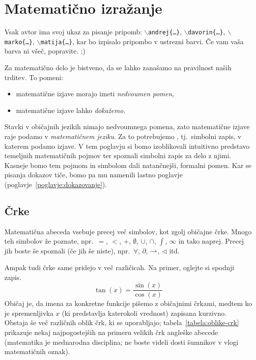 \chapter{Matematično izražanje}\label{poglavje:matematicno-izrazanje}


        \alert{Vsak avtor ima svoj ukaz za pisanje pripomb: \textcolor{andrejcolor}{\texttt{$\backslash$andrej\{\ldots\}}}, \textcolor{davorincolor}{\texttt{$\backslash$davorin\{\ldots\}}}, \textcolor{markocolor}{\texttt{$\backslash$marko\{\ldots\}}}, \textcolor{matijacolor}{\texttt{$\backslash$matija\{\ldots\}}}, kar bo izpisalo pripombo v ustrezni barvi. Če vam vaša barva ni všeč, popravite. ;)}


        Za matematično delo je bistveno, da se lahko zanašamo na pravilnost naših trditev. To pomeni:
        \begin{itemize}
                \item
                        matematične izjave morajo imeti \emph{nedvoumen pomen},
                \item
                        matematične izjave lahko \emph{dokažemo}.
        \end{itemize}

        Stavki v običajnih jezikih nimajo nedvoumnega pomena, zato matematične izjave raje podamo v \emph{matematičnem jeziku}. Za to potrebujemo , tj.~simbolni zapis, v katerem podamo izjave. V tem poglavju si bomo izoblikovali intuitivno predstavo temeljnih matematičnih pojmov ter spoznali simbolni zapis za delo z njimi. Kasneje bomo tem pojmom in simbolom dali natančnejši, formalni pomen. Kar se pisanja dokazov tiče, bomo pa mu namenili lastno poglavje (poglavje~\ref{poglavje:dokazovanje}).


        \section{Črke}

                Matematična abeceda vsebuje precej več simbolov, kot zgolj običajne črke. Mnogo teh simbolov že poznate, npr.~$=$, $<$, $+$, $\emptyset$, $\cup$, $\cap$, $\int$, $\infty$ in tako naprej. Precej jih boste še spoznali (če jih še niste), npr.~$\forall$, $\partial$, $\mathrel{\rightharpoonup}$, $\lhd$ itd.

                Ampak tudi črke same pridejo v več različicah. Na primer, oglejte si spodnji zapis.
                \[\tan(x) = \frac{\sin(x)}{\cos(x)}\]
                Običaj je, da imena za konkretne funkcije pišemo z običajnimi črkami, medtem ko je spremenljivka $x$ (ki predstavlja katerokoli vrednost) zapisana kurzivno. Obstaja še več različnih oblik črk, ki se uporabljajo; tabela~\ref{tabela:oblike-crk} prikazuje nekaj najpogostejših na primeru velikih črk angleške abecede (matematika je mednarodna disciplina; ne boste videli dosti šumnikov v vlogi matematičnih oznak).

